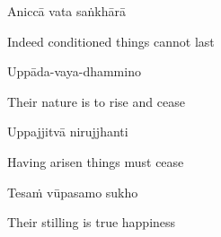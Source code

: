 \suttaRef{[Dhp 41]}

Aniccā vata saṅkhārā

\begin{english}
  Indeed conditioned things cannot last
\end{english}

Uppāda-vaya-dhammino

\begin{english}
  Their nature is to rise and cease\ifdigital\makeatletter\hyperlink{endnote106-appendix}\makeatother\fi
\end{english}

Uppajjitvā nirujjhanti

\begin{english}
  Having arisen things must cease
\end{english}

Tesaṁ vūpasamo sukho

\begin{english}
  Their stilling is true happiness
\end{english}

\ifbfive\enlargethispage{1\baselineskip}\fi

\suttaRef{[DN 16]}

\ifdigital{}\fi

\ifbfive
  \cleardoublepage
\fi

